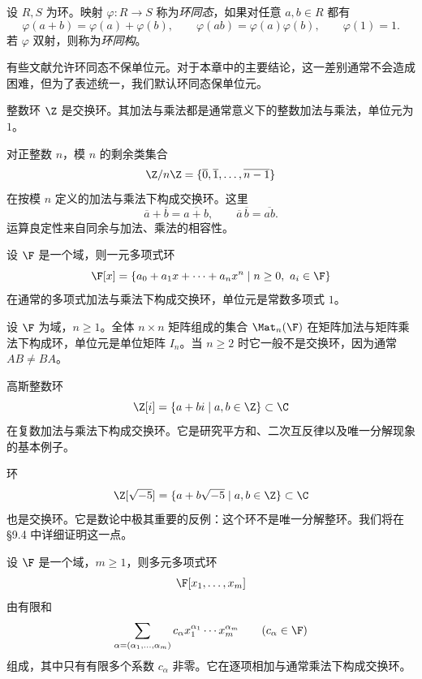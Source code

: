 \begin{definition}
设 $R,S$ 为环。映射 $\varphi:R\to S$ 称为\emph{环同态}，如果对任意 $a,b\in R$ 都有
\[
\varphi(a+b)=\varphi(a)+\varphi(b),\qquad \varphi(ab)=\varphi(a)\varphi(b),\qquad \varphi(1)=1.
\]
若 $\varphi$ 双射，则称为\emph{环同构}。
\end{definition}

\begin{remark}
有些文献允许环同态不保单位元。对于本章中的主要结论，这一差别通常不会造成困难，但为了表述统一，我们默认环同态保单位元。
\end{remark}

\begin{example}
整数环 $\Z$ 是交换环。其加法与乘法都是通常意义下的整数加法与乘法，单位元为 $1$。
\end{example}

\begin{example}
对正整数 $n$，模 $n$ 的剩余类集合
\[
\Z/n\Z=\{\overline{0},\overline{1},\dots,\overline{n-1}\}
\]
在按模 $n$ 定义的加法与乘法下构成交换环。这里
\[
\overline{a}+\overline{b}=\overline{a+b},\qquad \overline{a}\,\overline{b}=\overline{ab}.
\]
运算良定性来自同余与加法、乘法的相容性。
\end{example}

\begin{example}
设 $\F$ 是一个域，则一元多项式环
\[
\F[x]=\left\{a_0+a_1x+\cdots+a_nx^n\mid n\ge 0,\ a_i\in\F\right\}
\]
在通常的多项式加法与乘法下构成交换环，单位元是常数多项式 $1$。
\end{example}

\begin{example}
设 $\F$ 为域，$n\ge 1$。全体 $n\times n$ 矩阵组成的集合 $\Mat_n(\F)$ 在矩阵加法与矩阵乘法下构成环，单位元是单位矩阵 $I_n$。当 $n\ge 2$ 时它一般不是交换环，因为通常 $AB\neq BA$。
\end{example}

\begin{example}
高斯整数环
\[
\Z[i]=\{a+bi\mid a,b\in\Z\}\subset \C
\]
在复数加法与乘法下构成交换环。它是研究平方和、二次互反律以及唯一分解现象的基本例子。
\end{example}

\begin{example}
环
\[
\Z[\sqrt{-5}]=\{a+b\sqrt{-5}\mid a,b\in\Z\}\subset \C
\]
也是交换环。它是数论中极其重要的反例：这个环不是唯一分解整环。我们将在 \S9.4 中详细证明这一点。
\end{example}

\begin{example}
设 $\F$ 是一个域，$m\ge 1$，则多元多项式环
\[
\F[x_1,\dots,x_m]
\]
由有限和
\[
\sum_{\alpha=(\alpha_1,\dots,\alpha_m)} c_{\alpha}x_1^{\alpha_1}\cdots x_m^{\alpha_m}
\qquad (c_{\alpha}\in \F)
\]
组成，其中只有有限多个系数 $c_{\alpha}$ 非零。它在逐项相加与通常乘法下构成交换环。
\end{example}

